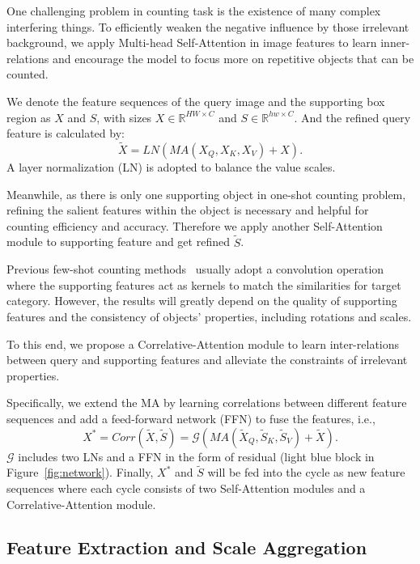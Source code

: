 \documentclass{article}
\begin{document}
One challenging problem in counting task is the existence of many complex interfering things. To efficiently weaken the negative influence by those irrelevant background, we apply Multi-head Self-Attention in image features to learn inner-relations and encourage the model to focus more on repetitive objects that can be counted.

We denote the feature sequences of the query image and the supporting box region as $X$ and $S$, with sizes $X \in \mathbb{R}^{HW \times C}$ and $S \in \mathbb{R}^{hw \times C}$. And the refined query feature is calculated by:
\begin{equation}
    \tilde{X} = LN(MA(X_Q,X_K,X_V)+X).
\end{equation}
A layer normalization (LN) is adopted to balance the value scales.

Meanwhile, as there is only one supporting object in one-shot counting problem, refining the salient features within the object is necessary and helpful for counting efficiency and accuracy. Therefore we apply another Self-Attention module to supporting feature and get refined $\tilde{S}$.

Previous few-shot counting methods~\cite{ranjan2021learning, yang2021class} usually adopt a convolution operation where the supporting features act as kernels to match the similarities for target category. However, the results will greatly depend on the quality of supporting features and the consistency of objects' properties, including rotations and scales.

To this end, we propose a Correlative-Attention module to learn inter-relations between query and supporting features and alleviate the constraints of irrelevant properties.

Specifically, we extend the MA by learning correlations between different feature sequences and add a feed-forward network (FFN) to fuse the features, i.e.,
\begin{equation}
    X^* = Corr(\tilde{X}, \tilde{S}) = \mathcal{G} (MA(\tilde{X}_Q,\tilde{S}_K,\tilde{S}_V)+\tilde{X}).
\end{equation}
$\mathcal{G}$ includes two LNs and a FFN in the form of residual (light blue block in Figure~\ref{fig:network}). Finally, $X^*$ and $\tilde{S}$ will be fed into the cycle as new feature sequences where each cycle consists of two Self-Attention modules and a Correlative-Attention module.



\subsection{Feature Extraction and Scale Aggregation}
\end{document}
